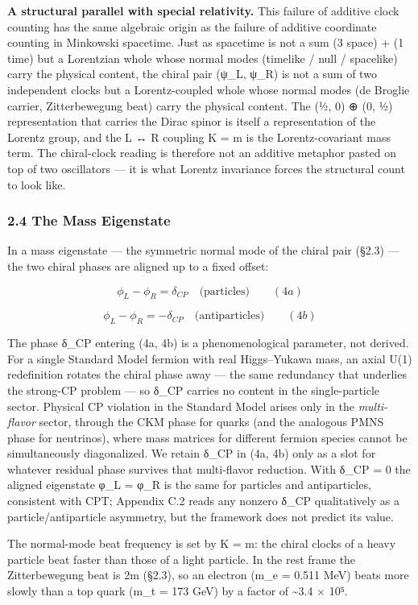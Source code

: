 \documentclass[
]{article}
\begin{document}
\textbf{A structural parallel with special relativity.} This failure of
additive clock counting has the same algebraic origin as the failure of
additive coordinate counting in Minkowski spacetime. Just as spacetime
is not a sum (3 space) + (1 time) but a Lorentzian whole whose normal
modes (timelike / null / spacelike) carry the physical content, the
chiral pair (ψ\_L, ψ\_R) is not a sum of two independent clocks but a
Lorentz-coupled whole whose normal modes (de Broglie carrier,
Zitterbewegung beat) carry the physical content. The (½, 0) ⊕ (0, ½)
representation that carries the Dirac spinor is itself a representation
of the Lorentz group, and the L ↔ R coupling K = m is the
Lorentz-covariant mass term. The chiral-clock reading is therefore not
an additive metaphor pasted on top of two oscillators --- it is what
Lorentz invariance forces the structural count to look like.

\subsubsection{2.4 The Mass Eigenstate}\label{the-mass-eigenstate}

In a mass eigenstate --- the symmetric normal mode of the chiral pair
(§2.3) --- the two chiral phases are aligned up to a fixed offset:

\[\phi_L - \phi_R = \delta_{CP} \quad \text{(particles)} \qquad (4a)\]

\[\phi_L - \phi_R = -\delta_{CP} \quad \text{(antiparticles)} \qquad (4b)\]

The phase δ\_CP entering (4a, 4b) is a phenomenological parameter, not
derived. For a single Standard Model fermion with real Higgs--Yukawa
mass, an axial U(1) redefinition rotates the chiral phase away --- the
same redundancy that underlies the strong-CP problem --- so δ\_CP
carries no content in the single-particle sector. Physical CP violation
in the Standard Model arises only in the \emph{multi-flavor} sector,
through the CKM phase for quarks (and the analogous PMNS phase for
neutrinos), where mass matrices for different fermion species cannot be
simultaneously diagonalized. We retain δ\_CP in (4a, 4b) only as a slot
for whatever residual phase survives that multi-flavor reduction. With
δ\_CP = 0 the aligned eigenstate φ\_L = φ\_R is the same for particles
and antiparticles, consistent with CPT; Appendix C.2 reads any nonzero
δ\_CP qualitatively as a particle/antiparticle asymmetry, but the
framework does not predict its value.

The normal-mode beat frequency is set by K = m: the chiral clocks of a
heavy particle beat faster than those of a light particle. In the rest
frame the Zitterbewegung beat is 2m (§2.3), so an electron (m\_e = 0.511
MeV) beats more slowly than a top quark (m\_t = 173 GeV) by a factor of
\textasciitilde3.4 × 10⁵.
\end{document}
